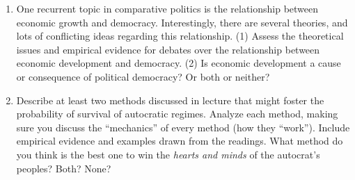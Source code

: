 \documentclass{article}
\begin{document}
\begin{enumerate}
    \item One recurrent topic in comparative politics is the relationship between economic growth and democracy. Interestingly, there are several theories, and lots of conflicting ideas regarding this relationship. (1) Assess the theoretical issues and empirical evidence for debates over the relationship between economic development and democracy. (2) Is economic development a cause or consequence of political democracy? Or both or neither? 
    \item Describe at least two methods discussed in lecture that might foster the probability of survival of autocratic regimes. Analyze each method, making sure you discuss the ``mechanics'' of every method (how they ``work''). Include empirical evidence and examples drawn from the readings. What method do you think is the best one to win the \emph{hearts and minds} of the autocrat's peoples? Both? None?
\end{enumerate}
\end{document}
